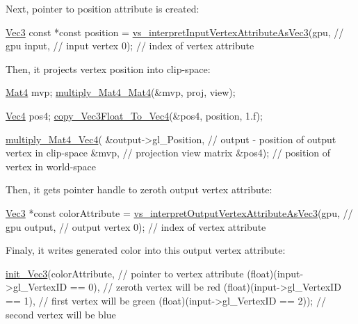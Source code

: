 Next, pointer to position attribute is created\-: 
\begin{DoxyCodeInclude}
  \hyperlink{structVec3}{Vec3} \textcolor{keyword}{const} *\textcolor{keyword}{const} position =
      \hyperlink{program_8h_a4bec56307c0d080bf314d20ff89773b2}{vs\_interpretInputVertexAttributeAsVec3}(gpu,    \textcolor{comment}{// gpu}
                                             input,  \textcolor{comment}{// input vertex}
                                             0);  \textcolor{comment}{// index of vertex attribute}
\end{DoxyCodeInclude}
Then, it projects vertex position into clip-\/space\-: 
\begin{DoxyCodeInclude}
  \hyperlink{structMat4}{Mat4} mvp;
  \hyperlink{linearAlgebra_8c_ab490710375f17e4c453720b4f3a6de1f}{multiply\_Mat4\_Mat4}(&mvp, proj, view);

  \hyperlink{structVec4}{Vec4} pos4;
  \hyperlink{linearAlgebra_8c_aa6574ab0f21fd2161a67abef60544177}{copy\_Vec3Float\_To\_Vec4}(&pos4, position, 1.f);

  \hyperlink{linearAlgebra_8c_ac2909e84e7ff2328f4022195c670f098}{multiply\_Mat4\_Vec4}(
      &output->gl\_Position,  \textcolor{comment}{// output - position of output vertex in clip-space}
      &mvp,                  \textcolor{comment}{// projection view matrix}
      &pos4);                \textcolor{comment}{// position of vertex in world-space}
\end{DoxyCodeInclude}
Then, it gets pointer handle to zeroth output vertex attribute\-: 
\begin{DoxyCodeInclude}
  \hyperlink{structVec3}{Vec3} *\textcolor{keyword}{const} colorAttribute =
      \hyperlink{program_8h_a60d0546dc8c052ee90f699ddca3b540b}{vs\_interpretOutputVertexAttributeAsVec3}(gpu,     \textcolor{comment}{// gpu}
                                              output,  \textcolor{comment}{// output vertex}
                                              0);  \textcolor{comment}{// index of vertex attribute}
\end{DoxyCodeInclude}
Finaly, it writes generated color into this output vertex attribute\-: 
\begin{DoxyCodeInclude}
  \hyperlink{linearAlgebra_8c_a898abc01a7905b120121d45afaba6635}{init\_Vec3}(colorAttribute,                     \textcolor{comment}{// pointer to vertex attribute}
            (\textcolor{keywordtype}{float})(input->gl\_VertexID == 0),   \textcolor{comment}{// zeroth vertex will be red}
            (\textcolor{keywordtype}{float})(input->gl\_VertexID == 1),   \textcolor{comment}{// first vertex will be green}
            (\textcolor{keywordtype}{float})(input->gl\_VertexID == 2));  \textcolor{comment}{// second vertex will be blue}
\end{DoxyCodeInclude}
